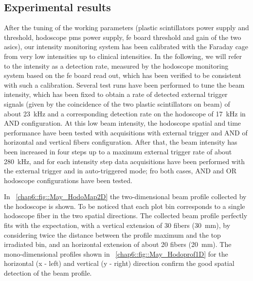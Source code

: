\subsection{Experimental results}\label{chap6::subsec::mayResults} 
After the tuning of the working parameters (plastic scintillators power supply and threshold, hodoscope \glspl{pm} power supply, \gls{fe} board threshold and gain of the two \glspl{asic}), our intensity monitoring system has been calibrated with the Faraday cage from very low intensities up to clinical intensities. In the following, we will refer to the intensity as a detection rate, measured by the hodoscope monitoring system based on the \gls{fe} board read out, which has been verified to be consistent with such a calibration.
Several test runs have been performed to tune the beam intensity, which has been fixed to obtain a rate of detected external trigger signals (given by the coincidence of the two plastic scintillators on beam) of about 23~kHz and a corresponding detection rate on the hodoscope of 17~kHz in AND configuration. At this low beam intensity, the hodoscope spatial and time performance have been tested with acquisitions with external trigger and AND of horizontal and vertical fibers configuration. 
After that, the beam intensity has been increased in four steps up to a maximum external trigger rate of about 280~kHz, and for each intensity step data acquisitions have been performed with the external trigger and in auto-triggered mode; fro both cases, AND and OR hodoscope configurations have been tested. 
 
In \figurename~\ref{chap6::fig::May_HodoMap2D} the two-dimensional beam profile collected by the hodoscope is shown. To be noticed that each plot bin corresponds to a single hodoscope fiber in the two spatial directions. The collected beam profile perfectly fits with the expectation, with a vertical extension of 30 fibers (30~mm), by considering twice the distance between the profile maximum and the top irradiated bin, and an horizontal extension of about 20 fibers (20~mm). The mono-dimensional profiles shown in \figurename~\ref{chap6::fig::May_Hodoprof1D} for the horizontal (x - left) and vertical (y - right) direction confirm the good spatial detection of the beam profile.     

